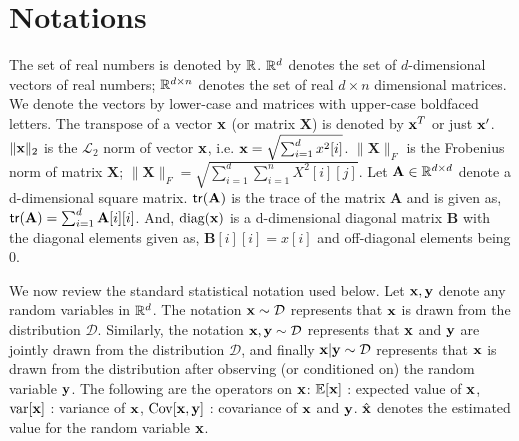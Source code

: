 \section{Notations}
\label{sec:notation}

The set of real numbers is denoted by $\mathbb{R}$. $\mathbb{R}^d$ denotes the set of
$d$-dimensional vectors of real numbers; $\mathbb{R}^{d\times n}$ denotes the
set of real $d\times n$ dimensional matrices. We denote the vectors by
lower-case and matrices with upper-case boldfaced letters. The
transpose of a vector $\mathbf{x}$ (or matrix $\mathbf{X}$) is denoted by
$\mathbf{x}^T$ or just $\mathbf{x}'$. $\|\mathbf{x}\|_2$ is the $\mathcal{L}_2$ norm of vector
$\mathbf{x}$, i.e. $\mathbf{x} = \sqrt{\sum_{i = 1}^{d} x^2[i]}$.  $\|\mathbf{X}\|_F$
is the Frobenius norm of matrix $\mathbf{X}$; \ie $\|\mathbf{X}\|_F =
\sqrt{\sum_{i = 1}^{d} \sum_{i = 1}^{n} X^2[i][j]}$. Let $\mathbf{A}
\in \mathbb{R}^{d\times d}$ denote a d-dimensional square matrix.
${\sf tr}(\mathbf{A})$ is the trace of the matrix $\mathbf{A}$ and is given
as, ${\sf tr}(\mathbf{A}) = \sum_{i = 1}^{d} \mathbf{A}[i][i]$. And,
$\text{diag}(\mathbf{x})$ is a d-dimensional diagonal matrix $\mathbf{B} $ with the
diagonal elements given as, $\mathbf{B}[i][i] = x [i]$ and
off-diagonal elements being 0.

We now review the standard statistical notation used below.  Let $\mathbf{x},
\mathbf{y}$ denote any random variables in $\mathbb{R}^d$. The notation $\mathbf{x} \sim
\mathcal{D}$ represents that $\mathbf{x}$ is drawn from the distribution
$\mathcal{D}$. Similarly, the notation $\mathbf{x}, \mathbf{y} \sim \mathcal{D}$
represents that $\mathbf{x}$ and $\mathbf{y}$ are jointly drawn from the distribution
$\mathcal{D}$, and finally $\mathbf{x} | \mathbf{y} \sim \mathcal{D}$ represents that
$\mathbf{x}$ is drawn from the distribution after observing (or conditioned
on) the random variable $\mathbf{y}$.  The following are the operators on
$\mathbf{x}$: $\mathbb{E}[\mathbf{x}]$ : expected value of $\mathbf{x}$, $\text{var}[\mathbf{x}]$ : variance
of $\mathbf{x}$, $\text{Cov}[\mathbf{x}, \mathbf{y}]$ : covariance of $\mathbf{x}$ and $\mathbf{y}$.
$\hat{\mathbf{x}}$ denotes the estimated value for the random variable $\mathbf{x}$.

